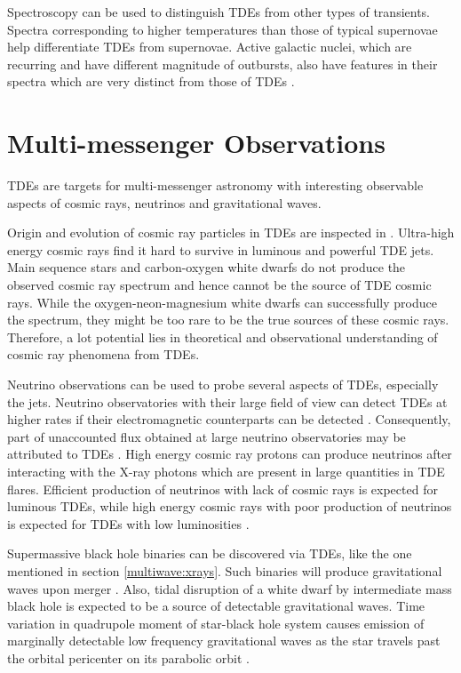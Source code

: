 \documentclass{tda}
\begin{document}
Spectroscopy can be used to distinguish TDEs from other types of transients. Spectra corresponding to higher temperatures than those of typical supernovae help differentiate TDEs from supernovae. Active galactic nuclei, which are recurring and have different magnitude of outbursts, also have features in their spectra which are very distinct from those of TDEs \cite{arcavi_continuum_2014}.


\section{Multi-messenger Observations} \label{multimessenger_astro}

TDEs are targets for multi-messenger astronomy with interesting observable aspects of cosmic rays, neutrinos and gravitational waves.

Origin and evolution of cosmic ray particles in TDEs are inspected in \cite{zhang_high-energy_2017}. Ultra-high energy cosmic rays find it hard to survive in luminous and powerful TDE jets. Main sequence stars and carbon-oxygen white dwarfs do not produce the observed cosmic ray spectrum and hence cannot be the source of TDE cosmic rays. While the oxygen-neon-magnesium white dwarfs can successfully produce the spectrum, they might be too rare to be the true sources of these cosmic rays. Therefore, a lot potential lies in theoretical and observational understanding of cosmic ray phenomena from TDEs.

Neutrino observations can be used to probe several aspects of TDEs, especially the jets. Neutrino observatories with their large field of view can detect TDEs at higher rates if their electromagnetic counterparts can be detected \cite{wang_probing_2011}. Consequently, part of unaccounted flux obtained at large neutrino observatories may be attributed to TDEs \cite{lunardini_high_2017}. High energy cosmic ray protons can produce neutrinos after interacting with the X-ray photons which are present in large quantities in TDE flares. Efficient production of neutrinos with lack of cosmic rays is expected for luminous TDEs, while high energy cosmic rays with poor production of neutrinos is expected for TDEs with low luminosities \cite{zhang_high-energy_2017}. 

Supermassive black hole binaries can be discovered via TDEs, like the one mentioned in section \ref{multiwave:xrays}. Such binaries will produce gravitational waves upon merger \cite{komossa_tidal_2015}. Also, tidal disruption of a white dwarf by intermediate mass black hole is expected to be a source of detectable gravitational waves. Time variation in quadrupole moment of star-black hole system causes emission of marginally detectable low frequency gravitational waves as the star travels past the orbital pericenter on its parabolic orbit \cite{kobayashi_gravitational_2004, nicholas_chamberlain_stone_tidal_2013}.  
\end{document}
